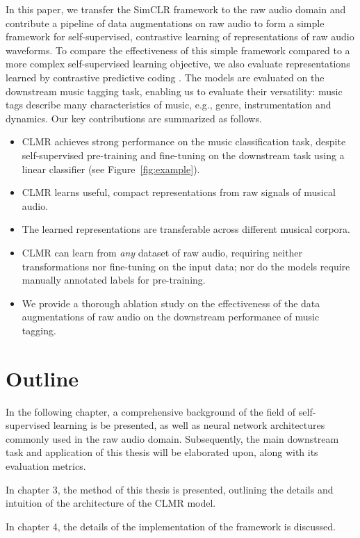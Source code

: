 In this paper, we transfer the SimCLR framework \cite{chen_simple_2020} to the raw audio domain and contribute a pipeline of data augmentations on raw audio to form a simple framework for self-supervised, contrastive  learning of representations of raw audio waveforms.
To compare the effectiveness of this simple framework compared to a more complex self-supervised learning objective, we also evaluate representations learned by contrastive predictive coding \cite{oord_representation_2019}.
The models are evaluated on the downstream music tagging task, enabling us to evaluate their versatility: music tags describe many characteristics of music, e.g., genre, instrumentation and dynamics.
Our key contributions are summarized as follows.
\begin{itemize}
    \item CLMR achieves strong performance on the music classification task, despite self-supervised pre-training and fine-tuning on the downstream task using a linear classifier (see Figure~\ref{fig:example}).
    \item CLMR learns useful, compact representations from raw signals of musical audio.
    \item The learned representations are transferable across different musical corpora.
    \item CLMR can learn from \emph{any} dataset of raw audio, requiring neither transformations nor fine-tuning on the input data; nor do the models require manually annotated labels for pre-training.
    \item We provide a thorough ablation study on the effectiveness of the data augmentations of raw audio on the downstream performance of music tagging.
\end{itemize}


\section{Outline}
In the following chapter, a comprehensive background of the field of self-supervised learning is be presented, as well as neural network architectures commonly used in the raw audio domain.
Subsequently, the main downstream task and application of this thesis will be elaborated upon, along with its evaluation metrics.

In chapter 3, the method of this thesis is presented, outlining the details and intuition of the architecture of the CLMR model.

In chapter 4, the details of the implementation of the framework is discussed.

